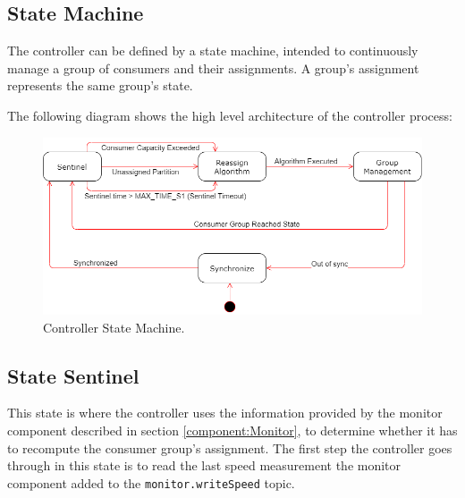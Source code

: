 \subsection{State Machine}

The controller can be defined by a state machine, intended to continuously
manage a group of consumers and their assignments. A group's assignment
represents the same group's state.

The following diagram shows the high level architecture of the controller
process:

\begin{figure}[H] 
\centering
\includegraphics[width=\textwidth]{images/controller/state_machine.png}
\caption{Controller State Machine.} 
\label{fig:state_machine} 
\end{figure}

\subsection{State Sentinel}

This state is where the controller uses the information provided by the monitor
component described in section \ref{component:Monitor}, to determine whether it
has to recompute the consumer group's assignment. The first step the controller
goes through in this state is to read the last speed measurement the monitor
component added to the \lstinline{monitor.writeSpeed} topic.

